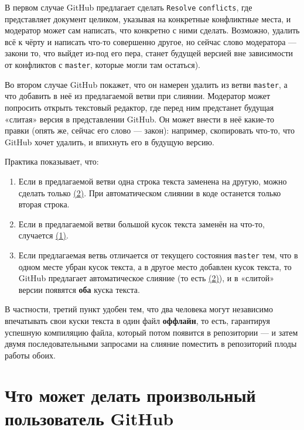\documentclass[12pt,a4paper,report]{ncc}
\begin{document}
\ms В первом случае GitHub предлагает сделать {\tt Resolve} {\tt conflicts}, где представляет документ целиком, указывая на конкретные конфликтные места, и модератор может сам написать, что конкретно с ними сделать. Возможно, удалить всё к чёрту и написать что-то совершенно другое, но сейчас слово модератора — закон\scolon и то, что выйдет из-под его пера, станет будущей версией вне зависимости от конфликтов с {\tt master}, которые могли там остаться).

\ms Во втором случае GitHub покажет, что он намерен удалить из ветви {\tt master}, а что добавить в неё из предлагаемой ветви при слиянии. Модератор может попросить открыть текстовый редактор, где перед ним предстанет будущая «слитая» версия в представлении GitHub. Он может внести в неё какие-то правки (опять же, сейчас его слово — закон): например, скопировать что-то, что GitHub хочет удалить, и впихнуть его в будущую версию.

\ms Практика показывает, что:

\def\lnka{\hyperref[var1]{(1)}}
\def\lnkb{\hyperref[var2]{(2)}}

\begin{enumerate}

\item Если в предлагаемой ветви одна строка текста заменена на другую, можно сделать только \lnkb. При автоматическом слиянии в коде останется только вторая строка.

\item Если в предлагаемой ветви большой кусок текста заменён на что-то, случается \lnka.

\item Если предлагаемая ветвь отличается от текущего состояния {\tt master} тем, что в одном месте убран кусок текста, а в другое место добавлен кусок текста, то GitHub предлагает автоматическое слияние (то есть \lnkb), и в «слитой» версии появятся {\bf оба} куска текста.

\end{enumerate}

\ms В частности, третий пункт удобен тем, что два человека могут независимо впечатывать свои куски текста в один файл {\bf оффлайн}, то есть, гарантируя успешную компиляцию файла, который потом появится в репозитории — и затем двумя последовательными запросами на слияние поместить в репозиторий плоды работы обоих.


\section{Что может делать произвольный пользователь GitHub}
\end{document}
